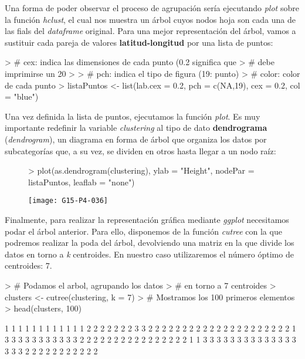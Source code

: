 \documentclass [a4paper] {article}
\begin{document}
Una forma de poder observar el proceso de agrupación sería ejecutando \textit{plot} sobre la función \textit{hclust}, el cual nos muestra un árbol cuyos nodos hoja son cada una de las fials del \textit{dataframe} original. Para una mejor representación del árbol, vamos a sustituir cada pareja de valores \textbf{latitud-longitud} por una lista de puntos:

\begin{Schunk}
\begin{Sinput}
> # cex: indica las dimensiones de cada punto (0.2 significa que
> # debe imprimirse un 20% mas pequeño con respecto al tamaño original)
> 
> # pch: indica el tipo de figura (19: punto)
> # color: color de cada punto
> listaPuntos <- list(lab.cex = 0.2, pch = c(NA,19), cex = 0.2, col = "blue")
\end{Sinput}
\end{Schunk}

Una vez definida la lista de puntos, ejecutamos la función \textit{plot}. Es muy importante redefinir la variable \textit{clustering} al tipo de dato \textbf{dendrograma} (\textit{dendrogram}), un diagrama en forma de árbol que organiza los datos por subcategorías que, a su vez, se dividen en otros hasta llegar a un nodo raíz:
\begin{figure}[h!]
\centering
\begin{Schunk}
\begin{Sinput}
> plot(as.dendrogram(clustering), ylab = "Height", nodePar = listaPuntos, leaflab = "none")
\end{Sinput}
\end{Schunk}
\texttt{[image: G15-P4-036]}
\end{figure}
\newpage
Finalmente, para realizar la representación gráfica mediante \textit{ggplot} necesitamos podar el árbol anterior. Para ello, disponemos de la función \textit{cutree} con la que podremos realizar la poda del árbol, devolviendo una matriz en la que divide los datos en torno a \textit{k} centroides. En nuestro caso utilizaremos el número óptimo de centroides: 7.
\begin{Schunk}
\begin{Sinput}
> # Podamos el arbol, agrupando los datos
> # en torno a 7 centroides
> clusters <- cutree(clustering, k = 7)
> # Mostramos los 100 primeros elementos
> head(clusters, 100)
\end{Sinput}
\begin{Soutput}
  [1] 1 1 1 1 1 1 1 1 1 1 1 1 2 2 2 2 2 2 2 3 3 2 2 2 2 2 2 2 2 2 2 2 2 2 2 2 2 2 2 2 2 2 1 3 3 3 3 3 3 3 3 3 3 3 2 2 2 2 2 2 2 2 2 2 2 2 2 2 2 2 1 1 3 3 3 3 3 3 3 3 3 3 3 3 3 3 3 3 3 2 2 2 2 2 2 2 2 2 2 2
\end{Soutput}
\end{Schunk}
\end{document}
